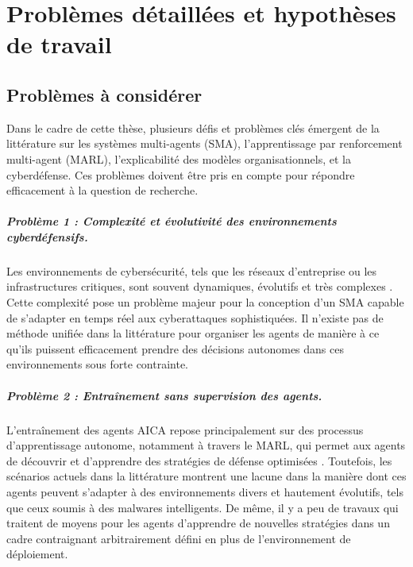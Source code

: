 \chapter{Problèmes détaillées et hypothèses de travail}\label{ch:problem}


\section{Problèmes à considérer}

Dans le cadre de cette thèse, plusieurs défis et problèmes clés émergent de la littérature sur les systèmes multi-agents (SMA), l'apprentissage par renforcement multi-agent (MARL), l'explicabilité des modèles organisationnels, et la cyberdéfense. Ces problèmes doivent être pris en compte pour répondre efficacement à la question de recherche.

\paragraph{Problème 1 : Complexité et évolutivité des environnements cyberdéfensifs.}
Les environnements de cybersécurité, tels que les réseaux d'entreprise ou les infrastructures critiques, sont souvent dynamiques, évolutifs et très complexes \cite{Calo2017, Kott2019}. Cette complexité pose un problème majeur pour la conception d'un SMA capable de s'adapter en temps réel aux cyberattaques sophistiquées. Il n'existe pas de méthode unifiée dans la littérature pour organiser les agents de manière à ce qu'ils puissent efficacement prendre des décisions autonomes dans ces environnements sous forte contrainte.

\paragraph{Problème 2 : Entraînement sans supervision des agents.}
L'entraînement des agents AICA repose principalement sur des processus d'apprentissage autonome, notamment à travers le MARL, qui permet aux agents de découvrir et d'apprendre des stratégies de défense optimisées \cite{Jamont2015, Theron2020}. Toutefois, les scénarios actuels dans la littérature montrent une lacune dans la manière dont ces agents peuvent s'adapter à des environnements divers et hautement évolutifs, tels que ceux soumis à des malwares intelligents. De même, il y a peu de travaux qui traitent de moyens pour les agents d'apprendre de nouvelles stratégies dans un cadre contraignant arbitrairement défini en plus de l'environnement de déploiement.

